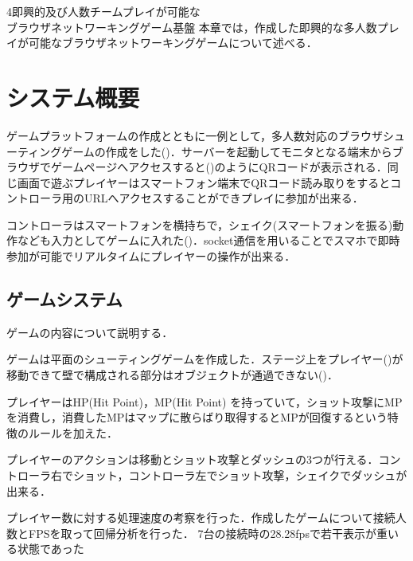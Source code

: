 \chapterhead
{4}{即興的及び人数チームプレイが可能な\\ブラウザネットワーキングゲーム基盤}
{本章では，作成した即興的な多人数プレイが可能なブラウザネットワーキングゲームについて述べる．}


\section{システム概要}
ゲームプラットフォームの作成とともに一例として，多人数対応のブラウザシューティングゲームの作成をした()．サーバーを起動してモニタとなる端末からブラウザでゲームページへアクセスすると()のようにQRコードが表示される．同じ画面で遊ぶプレイヤーはスマートフォン端末でQRコード読み取りをするとコントローラ用のURLへアクセスすることができプレイに参加が出来る．

コントローラはスマートフォンを横持ちで，シェイク(スマートフォンを振る)動作なども入力としてゲームに入れた()．socket通信\cite{webpagesocketio}を用いることでスマホで即時参加が可能でリアルタイムにプレイヤーの操作が出来る．


\subsection{ゲームシステム}
ゲームの内容について説明する．

ゲームは平面のシューティングゲームを作成した．ステージ上をプレイヤー()が移動できて壁で構成される部分はオブジェクトが通過できない()．

プレイヤーはHP(Hit Point)，MP(Hit Point) を持っていて，ショット攻撃にMPを消費し，消費したMPはマップに散らばり取得するとMPが回復するという特徴のルールを加えた．

プレイヤーのアクションは移動とショット攻撃とダッシュの3つが行える．コントローラ右でショット，コントローラ左でショット攻撃，シェイクでダッシュが出来る．

プレイヤー数に対する処理速度の考察を行った．作成したゲームについて接続人数とFPSを取って回帰分析を行った．
7台の接続時の28.28fpsで若干表示が重いる状態であった

